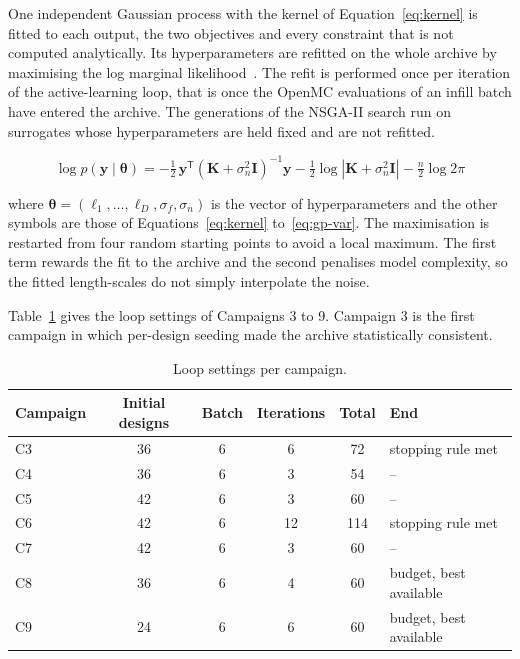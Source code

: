 One independent Gaussian process with the kernel of
Equation~\eqref{eq:kernel} is fitted to each output, the two objectives
and every constraint that is not computed analytically. Its
hyperparameters are refitted on the whole archive by maximising the log
marginal likelihood~\cite{rasmussen_gp_2006}. The refit is performed
once per iteration of the active-learning loop, that is once the
OpenMC evaluations of an infill batch have entered the archive. The
generations of the NSGA-II search run on surrogates whose
hyperparameters are held fixed and are not refitted.

\begin{equation}
\log p(\mathbf{y} \mid \boldsymbol{\theta})
= -\tfrac{1}{2}\,\mathbf{y}^{\mathsf T}
\left( \mathbf{K} + \sigma_n^{2}\mathbf{I} \right)^{-1} \mathbf{y}
- \tfrac{1}{2} \log \left| \mathbf{K} + \sigma_n^{2}\mathbf{I} \right|
- \tfrac{n}{2} \log 2\pi
\label{eq:gp-lml}
\end{equation}

\noindent where $\boldsymbol{\theta} = (\ell_1, \dots, \ell_D,
\sigma_f, \sigma_n)$ is the vector of hyperparameters and the other
symbols are those of Equations~\eqref{eq:kernel} to~\eqref{eq:gp-var}.
The maximisation is restarted from four random starting points to avoid
a local maximum. The first term rewards the fit to the archive and the
second penalises model complexity, so the fitted length-scales do not
simply interpolate the noise.

Table~\ref{tab:loop-settings} gives the loop settings of Campaigns 3
to 9. Campaign 3 is the first campaign in which per-design seeding made
the archive statistically consistent.

\begin{table}[htbp]
  \centering
  \small
  \caption{Loop settings per campaign.}
  \label{tab:loop-settings}
  \begin{tabular}{@{}lccccl@{}}
    \toprule
    Campaign & Initial designs & Batch & Iterations & Total & End \\
    \midrule
    C3 & 36 & 6 & 6  & 72  & stopping rule met \\
    C4 & 36 & 6 & 3  & 54  & -- \\
    C5 & 42 & 6 & 3  & 60  & -- \\
    C6 & 42 & 6 & 12 & 114 & stopping rule met \\
    C7 & 42 & 6 & 3  & 60  & -- \\
    C8 & 36 & 6 & 4  & 60  & budget, best available \\
    C9 & 24 & 6 & 6  & 60  & budget, best available \\
    \bottomrule
  \end{tabular}
\end{table}

